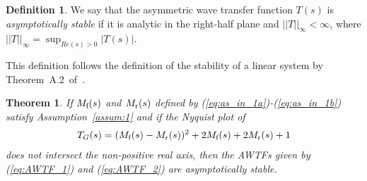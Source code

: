 \documentclass[10pt,twocolumn,twoside]{IEEEtran}
\newtheorem{theorem}{Theorem}
\theoremstyle{definition}
\newtheorem{defn}{Definition}
\newcommand{\revB}{Black}
\begin{document}
\begin{defn}
  We say that the asymmetric wave transfer function $T(s)$ is \emph{asymptotically stable} if it is analytic in the right-half plane and $||T||_{\infty} < \infty$, where $||T||_{\infty} = \sup_{Re(s) >0} |T(s)|$.
\end{defn}
This definition follows the definition of the stability of a linear system by Theorem~A.2~of~\cite{Curtain2009}.



\begin{theorem}\label{lem:AWTF_stab}
If $M_{\textnormal{f}}(s)$ and $M_{\textnormal{r}}(s)$ defined by (\ref{eq:as_in_1a})-(\ref{eq:as_in_1b}) satisfy Assumption~\ref{assum:1} and if the Nyquist plot of
 \begin{align}
  T_{G}(s) = (M_{\textnormal{f}}(s)-M_{\textnormal{r}}(s))^2+ 2M_{\textnormal{f}}(s)+2M_{\textnormal{r}}(s) +1
\end{align}
does not intersect the non-positive real axis, then the AWTFs {\color{\revB}given by (\ref{eq:AWTF_1}) and (\ref{eq:AWTF_2})} are asymptotically stable.
\end{theorem}
\end{document}
